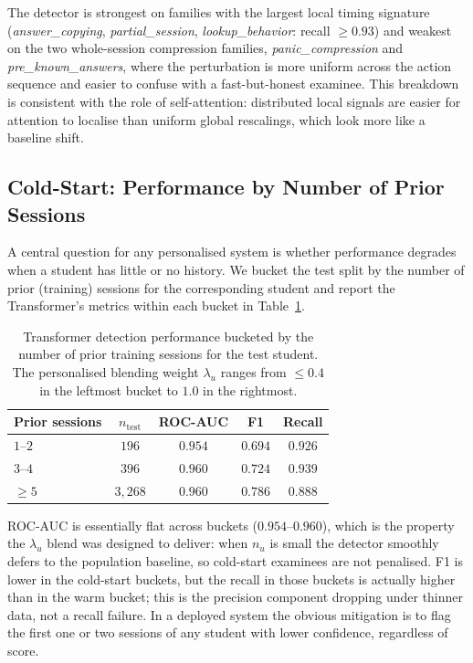 \documentclass[sigconf]{acmart}
\begin{document}
The detector is strongest on families with the largest local timing signature (\emph{answer\_copying}, \emph{partial\_session}, \emph{lookup\_behavior}: recall $\geq 0.93$) and weakest on the two whole-session compression families, \emph{panic\_compression} and \emph{pre\_known\_answers}, where the perturbation is more uniform across the action sequence and easier to confuse with a fast-but-honest examinee. This breakdown is consistent with the role of self-attention: distributed local signals are easier for attention to localise than uniform global rescalings, which look more like a baseline shift.

\subsection{Cold-Start: Performance by Number of Prior Sessions}
\label{sec:cold_start}
A central question for any personalised system is whether performance degrades when a student has little or no history. We bucket the test split by the number of prior (training) sessions for the corresponding student and report the Transformer's metrics within each bucket in Table~\ref{tab:cold_start}.

\begin{table}[htbp]
\caption{Transformer detection performance bucketed by the number of prior training sessions for the test student. The personalised blending weight $\lambda_u$ ranges from $\le 0.4$ in the leftmost bucket to $1.0$ in the rightmost.}
\label{tab:cold_start}
\centering
\small
\begin{tabular}{lcccc}
\toprule
\textbf{Prior sessions} & \textbf{$n_{\text{test}}$} & \textbf{ROC-AUC} & \textbf{F1} & \textbf{Recall} \\
\midrule
$1$--$2$  & $196$  & $0.954$ & $0.694$ & $0.926$ \\
$3$--$4$  & $396$  & $0.960$ & $0.724$ & $0.939$ \\
$\geq 5$  & $3{,}268$ & $0.960$ & $0.786$ & $0.888$ \\
\bottomrule
\end{tabular}
\end{table}

ROC-AUC is essentially flat across buckets ($0.954$--$0.960$), which is the property the $\lambda_u$ blend was designed to deliver: when $n_u$ is small the detector smoothly defers to the population baseline, so cold-start examinees are not penalised. F1 is lower in the cold-start buckets, but the recall in those buckets is actually higher than in the warm bucket; this is the precision component dropping under thinner data, not a recall failure. In a deployed system the obvious mitigation is to flag the first one or two sessions of any student with lower confidence, regardless of score.
\end{document}
